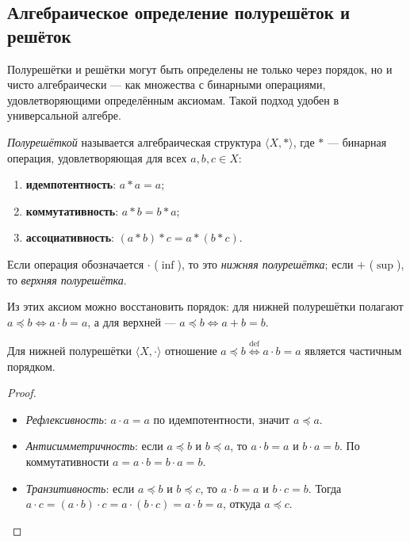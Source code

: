 \documentclass[10pt]{article}
\begin{document}
\subsection{Алгебраическое определение полурешёток и решёток}
Полурешётки и решётки могут быть определены не только через порядок, но и чисто алгебраически — как множества с бинарными операциями, удовлетворяющими определённым аксиомам. Такой подход удобен в универсальной алгебре.

\begin{definition}
\textit{Полурешёткой} называется алгебраическая структура $\langle X, \ast \rangle$, где $\ast$ — бинарная операция, удовлетворяющая для всех $a,b,c\in X$:
\begin{enumerate}
    \item \textbf{идемпотентность}: $a \ast a = a$;
    \item \textbf{коммутативность}: $a \ast b = b \ast a$;
    \item \textbf{ассоциативность}: $(a \ast b) \ast c = a \ast (b \ast c)$.
\end{enumerate}
Если операция обозначается $\cdot$ ($\inf$), то это \textit{нижняя полурешётка}; если $+$ ($\sup$), то \textit{верхняя полурешётка}.
\end{definition}

Из этих аксиом можно восстановить порядок: для нижней полурешётки полагают $a \preceq b \iff a \cdot b = a$, а для верхней — $a \preceq b \iff a + b = b$.

\begin{theorem}
Для нижней полурешётки $\langle X, \cdot \rangle$ отношение $a \preceq b \stackrel{\text{def}}{\iff} a \cdot b = a$ является частичным порядком.
\end{theorem}
\begin{proof}\;
\begin{itemize}
    \item \textit{Рефлексивность}: $a \cdot a = a$ по идемпотентности, значит $a \preceq a$.
    \item \textit{Антисимметричность}: если $a \preceq b$ и $b \preceq a$, то $a \cdot b = a$ и $b \cdot a = b$. По коммутативности $a = a \cdot b = b \cdot a = b$.
    \item \textit{Транзитивность}: если $a \preceq b$ и $b \preceq c$, то $a \cdot b = a$ и $b \cdot c = b$. Тогда $a \cdot c = (a \cdot b) \cdot c = a \cdot (b \cdot c) = a \cdot b = a$, откуда $a \preceq c$.
\end{itemize}
\end{proof}
\end{document}
